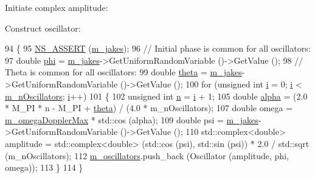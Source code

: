 \begin{DoxyEnumerate}
\item Initiate complex amplitude\+:
\item Construct oscillator\+: 
\end{DoxyEnumerate}
\begin{DoxyCode}
94 \{
95   \hyperlink{assert_8h_a6dccdb0de9b252f60088ce281c49d052}{NS\_ASSERT} (\hyperlink{classns3_1_1JakesProcess_aec08be974a3d3428286077332e09957e}{m\_jakes});
96   \textcolor{comment}{// Initial phase is common for all oscillators:}
97   \textcolor{keywordtype}{double} \hyperlink{buildings__pathloss_8m_aaf40c223796354fb6b79c9ed047c513a}{phi} = \hyperlink{classns3_1_1JakesProcess_aec08be974a3d3428286077332e09957e}{m\_jakes}->GetUniformRandomVariable ()->GetValue ();
98   \textcolor{comment}{// Theta is common for all oscillators:}
99   \textcolor{keywordtype}{double} \hyperlink{loss__ITU1411__NLOS__over__rooftop_8m_a68ce9834ce390774bce9c89b78d5bf79}{theta} = \hyperlink{classns3_1_1JakesProcess_aec08be974a3d3428286077332e09957e}{m\_jakes}->GetUniformRandomVariable ()->GetValue ();
100   \textcolor{keywordflow}{for} (\textcolor{keywordtype}{unsigned} \textcolor{keywordtype}{int} \hyperlink{bernuolliDistribution_8m_a6f6ccfcf58b31cb6412107d9d5281426}{i} = 0; \hyperlink{bernuolliDistribution_8m_a6f6ccfcf58b31cb6412107d9d5281426}{i} < \hyperlink{classns3_1_1JakesProcess_a356927b16370f2b694f61775adbb1c4b}{m\_nOscillators}; \hyperlink{bernuolliDistribution_8m_a6f6ccfcf58b31cb6412107d9d5281426}{i}++)
101     \{
102       \textcolor{keywordtype}{unsigned} \textcolor{keywordtype}{int} \hyperlink{namespacesample-rng-plot_aeb5ee5c431e338ef39b7ac5431242e1d}{n} = \hyperlink{bernuolliDistribution_8m_a6f6ccfcf58b31cb6412107d9d5281426}{i} + 1;
105       \textcolor{keywordtype}{double} \hyperlink{lte__uplink__power__control_8m_a62197192f0fbf4e0675eb37be1c4c175}{alpha} = (2.0 * M\_PI * n - M\_PI + \hyperlink{loss__ITU1411__NLOS__over__rooftop_8m_a68ce9834ce390774bce9c89b78d5bf79}{theta}) / (4.0 * m\_nOscillators);
107       \textcolor{keywordtype}{double} omega = \hyperlink{classns3_1_1JakesProcess_ac9e2529b40af28efc63d75c981617594}{m\_omegaDopplerMax} * std::cos (alpha);
109       \textcolor{keywordtype}{double} psi = \hyperlink{classns3_1_1JakesProcess_aec08be974a3d3428286077332e09957e}{m\_jakes}->GetUniformRandomVariable ()->GetValue ();
110       std::complex<double> amplitude = std::complex<double> (std::cos (psi), std::sin (psi)) * 2.0 / 
      std::sqrt (m\_nOscillators);
112       \hyperlink{classns3_1_1JakesProcess_a755674c3009ba93c4a1c0ca064911e75}{m\_oscillators}.push\_back (Oscillator (amplitude, phi, omega)); 
113     \}
114 \}
\end{DoxyCode}


